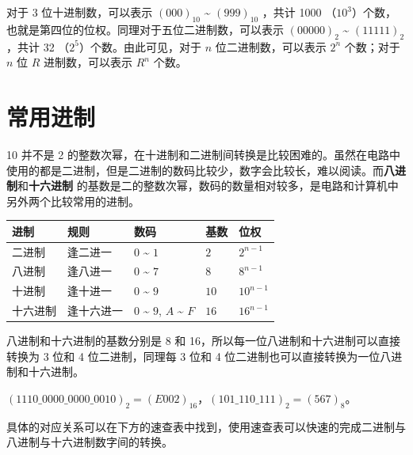 对于 3 位十进制数，可以表示 $(000)_{10}$ \textasciitilde{} $(999)_{10}$ ，共计 1000 （$10 ^ 3$）个数，也就是第四位的位权。同理对于五位二进制数，可以表示 $(00000)_{2}$ \textasciitilde{} $(11111)_{2}$ ，共计 32 （$2 ^ 5$）个数。由此可见，对于 $n$ 位二进制数，可以表示 $2 ^ n$ 个数；对于 $n$ 位 $R$ 进制数，可以表示 $R ^ n$ 个数。

\section{常用进制}

10 并不是 2 的整数次幂，在十进制和二进制间转换是比较困难的。虽然在电路中使用的都是二进制，但是二进制的数码比较少，数字会比较长，难以阅读。而\textbf{八进制}和\textbf{十六进制} 的基数是二的整数次幂，数码的数量相对较多，是电路和计算机中另外两个比较常用的进制。

\begin{longtable}{|l|l|l|l|l|}
\hline
\textbf{进制} & \textbf{规则} & \textbf{数码} & \textbf{基数} & \textbf{位权} \\ \hline
\endhead
二进制 & 逢二进一 & $0$ \textasciitilde{} $1$ & $2$ & $2 ^ {n-1}$ \\ \hline
八进制 & 逢八进一 & $0$ \textasciitilde{} $7$ & $8$ & $8 ^ {n-1}$ \\ \hline
十进制 & 逢十进一 & $0$ \textasciitilde{} $9$ & $10$ & $10 ^ {n-1}$ \\ \hline
十六进制 & 逢十六进一 & $0$ \textasciitilde{} $9$, $A$ \textasciitilde{} $F$ & $16$ & $16 ^ {n-1}$ \\ \hline
\end{longtable}

八进制和十六进制的基数分别是 8 和 16，所以每一位八进制和十六进制可以直接转换为 3 位和 4 位二进制，同理每 3 位和 4 位二进制也可以直接转换为一位八进制和十六进制。

\begin{example}{}{}
  $(1110\_0000\_0000\_0010)_{2} = (E002)_{16}$，$(101\_110\_111)_{2} = (567)_{8}$。
\end{example}

具体的对应关系可以在下方的速查表中找到，使用速查表可以快速的完成二进制与八进制与十六进制数字间的转换。

